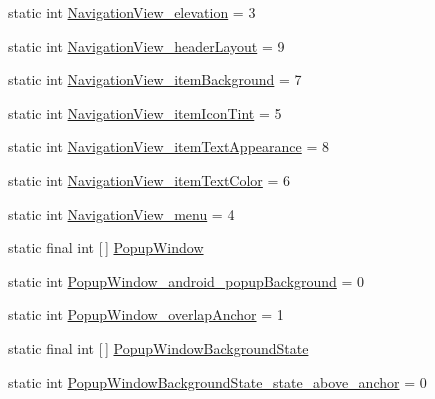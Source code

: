 \begin{DoxyCompactItemize}
\item 
static int \hyperlink{classandroid_1_1support_1_1v7_1_1mediarouter_1_1R_1_1styleable_a9adfb6c1531f42fcb13fc779ad226cba}{Navigation\+View\+\_\+elevation} = 3
\item 
static int \hyperlink{classandroid_1_1support_1_1v7_1_1mediarouter_1_1R_1_1styleable_a7b1715c8e39e70061cbfe8406b79ca36}{Navigation\+View\+\_\+header\+Layout} = 9
\item 
static int \hyperlink{classandroid_1_1support_1_1v7_1_1mediarouter_1_1R_1_1styleable_a0e5c6e8724e0794382e48dafeb5fcbb3}{Navigation\+View\+\_\+item\+Background} = 7
\item 
static int \hyperlink{classandroid_1_1support_1_1v7_1_1mediarouter_1_1R_1_1styleable_aa391656f8e7f8b9e6d640d174be638d3}{Navigation\+View\+\_\+item\+Icon\+Tint} = 5
\item 
static int \hyperlink{classandroid_1_1support_1_1v7_1_1mediarouter_1_1R_1_1styleable_a1544b6d2a4ba48eb068d259a34bb4b3b}{Navigation\+View\+\_\+item\+Text\+Appearance} = 8
\item 
static int \hyperlink{classandroid_1_1support_1_1v7_1_1mediarouter_1_1R_1_1styleable_a3c571ca687d7349f2b900a1e08fdfe9d}{Navigation\+View\+\_\+item\+Text\+Color} = 6
\item 
static int \hyperlink{classandroid_1_1support_1_1v7_1_1mediarouter_1_1R_1_1styleable_ad31f7de14ec7c207bec4854f7a839a82}{Navigation\+View\+\_\+menu} = 4
\item 
static final int \mbox{[}$\,$\mbox{]} \hyperlink{classandroid_1_1support_1_1v7_1_1mediarouter_1_1R_1_1styleable_a9b218bd30c0404b44b45f04537f6bcb7}{Popup\+Window}
\item 
static int \hyperlink{classandroid_1_1support_1_1v7_1_1mediarouter_1_1R_1_1styleable_abc45dabaad402f4b4e9b1d543e43f4d9}{Popup\+Window\+\_\+android\+\_\+popup\+Background} = 0
\item 
static int \hyperlink{classandroid_1_1support_1_1v7_1_1mediarouter_1_1R_1_1styleable_ad87542b0d9c886bff1bf83a1eaa6ffab}{Popup\+Window\+\_\+overlap\+Anchor} = 1
\item 
static final int \mbox{[}$\,$\mbox{]} \hyperlink{classandroid_1_1support_1_1v7_1_1mediarouter_1_1R_1_1styleable_a716145c1da7306108d9ae51de6ea6eed}{Popup\+Window\+Background\+State}
\item 
static int \hyperlink{classandroid_1_1support_1_1v7_1_1mediarouter_1_1R_1_1styleable_a66e99f54d31428c26c86bfd6a4191e2f}{Popup\+Window\+Background\+State\+\_\+state\+\_\+above\+\_\+anchor} = 0
\item 

\end{DoxyCompactItemize}
